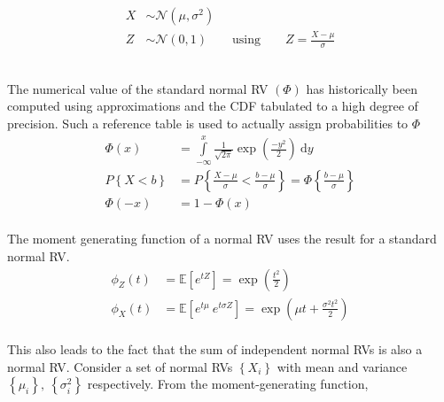 \begin{align}
	X &\sim \mathcal{N}(\mu, \sigma^2) \nonumber \\[1ex]
	Z &\sim \mathcal{N}(0, 1) \qquad \text{using} \qquad Z = \frac{X - \mu}{\sigma}
\end{align}\\

\begin{figure}[H]
	\centering
\end{figure}

The numerical value of the standard normal RV $ (\Phi) $ has historically been computed using approximations and the CDF tabulated to a high degree of precision. Such a reference table is used to actually assign probabilities to $ \Phi $ \\

\begin{align}
	\Phi(x) &= \int\limits_{-\infty}^{x} \frac{1}{\sqrt{2 \pi}} \exp \left(\frac{-y^2}{2}\right)\ \mathrm{d}y \\[1ex]
	P\left\{X < b\right\} &= P \left\{\frac{X - \mu}{\sigma} < \frac{b - \mu}{\sigma}\right\} = \Phi \left\{\frac{b - \mu}{\sigma}\right\} \\[1ex]
	\Phi(-x) &= 1 - \Phi(x)
\end{align}\\

The moment generating function of a normal RV uses the result for a standard normal RV. \\

\begin{align}
	\phi_Z (t) &= \mathbb{E}[e^{tZ}] = \exp\left(\frac{t^2}{2}\right)	  \\[1ex]
	\phi_X (t) &= \mathbb{E}[e^{t\mu}\ e^{t \sigma Z}] = \exp\left(\mu t + \frac{\sigma^2 t^2}{2}\right)
\end{align}\\

This also leads to the fact that the sum of independent normal RVs is also a normal RV. Consider a set of normal RVs $ \left\{X_i\right\} $ with mean and variance $ \left\{\mu_i\right\},\ \left\{\sigma^2_i\right\} $ respectively. From the moment-generating function, \\

